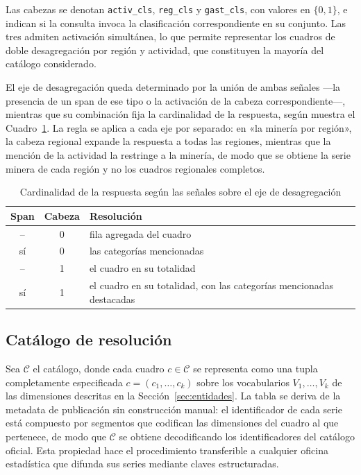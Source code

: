 \documentclass[11pt]{article}
\begin{document}
Las cabezas se denotan \texttt{activ\_cls}, \texttt{reg\_cls} y \texttt{gast\_cls}, con valores en $\{0,1\}$, e indican si la consulta invoca la clasificación correspondiente en su conjunto. Las tres admiten activación simultánea, lo que permite representar los cuadros de doble desagregación por región y actividad, que constituyen la mayoría del catálogo considerado.

El eje de desagregación queda determinado por la unión de ambas señales ---la presencia de un span de ese tipo o la activación de la cabeza correspondiente---, mientras que su combinación fija la cardinalidad de la respuesta, según muestra el Cuadro~\ref{tab:cardinalidad}. La regla se aplica a cada eje por separado: en «la minería por región», la cabeza regional expande la respuesta a todas las regiones, mientras que la mención de la actividad la restringe a la minería, de modo que se obtiene la serie minera de cada región y no los cuadros regionales completos.

\begin{table}[htbp]
\centering
\caption{Cardinalidad de la respuesta según las señales sobre el eje de desagregación}
\label{tab:cardinalidad}
\begin{tabular}{ccl}
\toprule
Span & Cabeza & Resolución \\
\midrule
--    & 0 & fila agregada del cuadro \\
sí    & 0 & las categorías mencionadas \\
--    & 1 & el cuadro en su totalidad \\
sí    & 1 & el cuadro en su totalidad, con las categorías mencionadas destacadas \\
\bottomrule
\end{tabular}
\end{table}

\subsection{Catálogo de resolución}
\label{sec:catalogo}

Sea $\mathcal{C}$ el catálogo, donde cada cuadro $c \in \mathcal{C}$ se representa como una tupla completamente especificada $c = (c_1,\dots,c_k)$ sobre los vocabularios $V_1,\dots,V_k$ de las dimensiones descritas en la Sección~\ref{sec:entidades}. La tabla se deriva de la metadata de publicación sin construcción manual: el identificador de cada serie está compuesto por segmentos que codifican las dimensiones del cuadro al que pertenece, de modo que $\mathcal{C}$ se obtiene decodificando los identificadores del catálogo oficial. Esta propiedad hace el procedimiento transferible a cualquier oficina estadística que difunda sus series mediante claves estructuradas.
\end{document}
